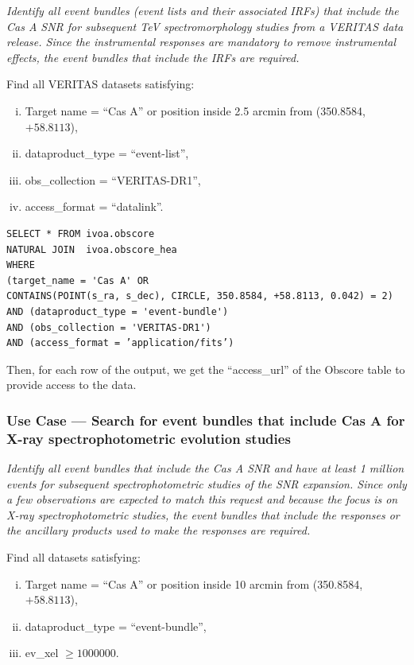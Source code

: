 {\em Identify all event bundles (event lists and their associated \glspl{IRF}) that include the Cas A SNR for subsequent TeV spectromorphology studies from a VERITAS data release. Since the instrumental responses are mandatory to remove instrumental effects, the event bundles that include the  \glspl{IRF} are required.\/}

\medskip
\noindent Find all VERITAS datasets satisfying:
\begin{enumerate}[(i)]
  \item Target name = ``Cas A'' or position inside 2.5 arcmin from (350.8584, $+58.8113$),
  \item dataproduct\_type = ``event-list'',
  \item obs\_collection = ``VERITAS-DR1'',
  \item access\_format = ``datalink''.
\end{enumerate}

\begin{verbatim}
SELECT * FROM ivoa.obscore
NATURAL JOIN  ivoa.obscore_hea
WHERE
(target_name = 'Cas A' OR
CONTAINS(POINT(s_ra, s_dec), CIRCLE, 350.8584, +58.8113, 0.042) = 2)
AND (dataproduct_type = 'event-bundle')
AND (obs_collection = 'VERITAS-DR1')
AND (access_format = ’application/fits’)
\end{verbatim}

Then, for each row of the output, we get the ``access\_url'' of the Obscore table to provide access to the data.


\subsubsection{Use Case --- Search for event bundles that include Cas A for X-ray spectrophotometric evolution studies}

{\em Identify all event bundles that include the Cas A SNR and have at least 1 million events for subsequent spectrophotometric studies of the SNR expansion. Since only a few observations are expected to match this request and because the focus is on X-ray spectrophotometric studies, the event bundles that include the responses or the ancillary products used to make the responses are required.\/}

\medskip
\noindent Find all datasets satisfying:
\begin{enumerate}[(i)]
  \item Target name = ``Cas A'' or position inside 10 arcmin from (350.8584, $+58.8113$),
  \item dataproduct\_type = ``event-bundle'',
  \item ev\_xel $\geq 1000000$.
\end{enumerate}

